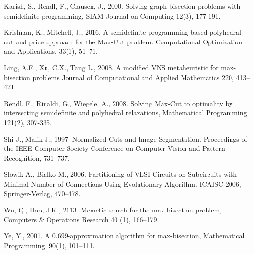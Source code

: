 \documentclass[10pt]{article}
\begin{document}
\begin{thebibliography}{00}
Karish, S.,  Rendl, F.,  Clausen, J., 2000. Solving graph bisection problems with
semidefinite programming, SIAM Journal on Computing 12(3), 177-191.


Krishnan, K.,  Mitchell, J., 2016. A semidefinite programming based polyhedral cut
and price approach for the Max-Cut problem. Computational Optimization
and Applications, 33(1), 51--71.


 Ling, A.F.,  Xu, C.X.,  Tang L., 2008.
A modified VNS metaheuristic for max-bisection problems
Journal of Computational and Applied Mathematics 220, 413--421


 Rendl, F.,  Rinaldi, G.,  Wiegele, A., 2008. Solving Max-Cut to optimality by intersecting
semidefinite and polyhedral relaxations, Mathematical Programming 121(2),
307-335.


Shi J., Malik J., 1997.
Normalized Cuts and Image Segmentation. Proceedings of the IEEE
Computer Society Conference on Computer Vision and Pattern Recognition, 731--737.


Slowik A., Bialko M., 2006.
Partitioning of VLSI Circuits on Subcircuits with Minimal Number 
of Connections Using Evolutionary Algorithm. ICAISC
2006,  Springer-Verlag,  470--478.


 Wu, Q.,  Hao, J.K., 2013.  Memetic search for the max-bisection
problem, Computers \& Operations Research
40 (1), 166--179.


Ye, Y., 2001. A 0.699-approximation algorithm for max-bisection, Mathematical
Programming, 90(1), 101--111.
















\end{thebibliography}

 \label{lastpage}
\end{document}
